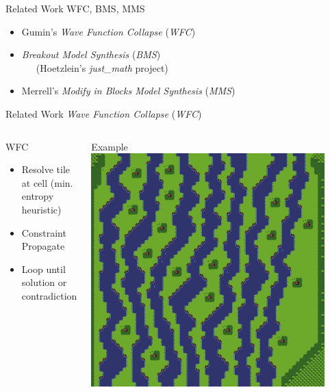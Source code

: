\documentclass{beamer}
\begin{document}
  \begin{frame}[fragile]{Related Work}
    WFC, BMS, MMS

    \begin{itemize}
      \item Gumin's \textit{Wave Function Collapse} (\textit{WFC})
      \item \textit{Breakout Model Synthesis} (\textit{BMS}) \\
        \ \ \ (Hoetzlein's \textit{just\_math} project)
      \item Merrell's \textit{Modify in Blocks Model Synthesis} (\textit{MMS})
    \end{itemize}
  \end{frame}


  \begin{frame}[fragile]{Related Work}
    \textit{Wave Function Collapse} (\textit{WFC})
    \begin{columns}[T,onlytextwidth]
        \begin{block}{WFC}
          \hfill \\
          \begin{itemize}
            \item Resolve tile at cell (min. entropy heuristic)
            \item Constraint Propagate
            \item Loop until solution or contradiction
          \end{itemize}
        \end{block}
        \begin{block}{Example}
          \includegraphics[width=0.9\textwidth]{img/forestmicro_64x64.pdf}
        \end{block}
    \end{columns}
  \end{frame}
\end{document}
